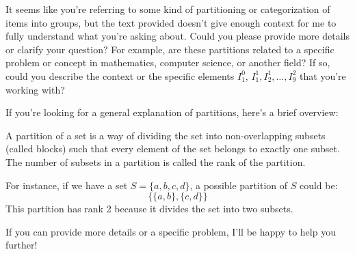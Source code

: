 It seems like you're referring to some kind of partitioning or categorization of items into groups, but the text provided doesn't give enough context for me to fully understand what you're asking about. Could you please provide more details or clarify your question? For example, are these partitions related to a specific problem or concept in mathematics, computer science, or another field? If so, could you describe the context or the specific elements \(I^0_1\), \(I^1_1, I^1_2, \ldots, I^2_9\) that you're working with?

If you're looking for a general explanation of partitions, here's a brief overview:

A partition of a set is a way of dividing the set into non-overlapping subsets (called blocks) such that every element of the set belongs to exactly one subset. The number of subsets in a partition is called the rank of the partition.

For instance, if we have a set \( S = \{a, b, c, d\} \), a possible partition of \( S \) could be:
\[ \{ \{a, b\}, \{c, d\} \} \]
This partition has rank 2 because it divides the set into two subsets.

If you can provide more details or a specific problem, I'll be happy to help you further!